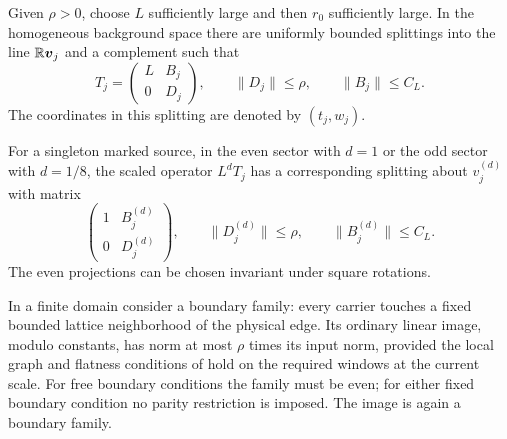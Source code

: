 \begin{proposition}
\label{rg:linear}
Given $\rho>0$, choose $L$ sufficiently large and then $r_0$ sufficiently
large.  In the homogeneous background space there are uniformly bounded
splittings into the line $\mathbb R\boldsymbol v_j$ and a complement such that
\begin{equation}
 T_j=
 \begin{pmatrix}L&B_j\\0&D_j\end{pmatrix},\qquad
 \|D_j\|\le\rho,\qquad \|B_j\|\le C_L.
 \label{rg:background-matrix}
\end{equation}
The coordinates in this splitting are denoted by $(t_j,w_j)$.

For a singleton marked source, in the even sector with $d=1$ or the odd
sector with $d=1/8$, the scaled operator $L^dT_j$ has a corresponding
splitting about $v_j^{(d)}$ with matrix
\begin{equation}
 \begin{pmatrix}1&B_j^{(d)}\\0&D_j^{(d)}\end{pmatrix},\qquad
 \|D_j^{(d)}\|\le\rho,\qquad \|B_j^{(d)}\|\le C_L.
 \label{rg:marked-matrix}
\end{equation}
The even projections can be chosen invariant under square rotations.

In a finite domain consider a boundary family: every carrier touches a
fixed bounded lattice neighborhood of the physical edge.  Its ordinary
linear image, modulo constants, has norm at most $\rho$ times its input
norm, provided the local graph and flatness conditions of
 hold on the required windows at the current scale.
For free boundary conditions the family must be even; for either fixed
boundary condition no parity restriction is imposed.  The image is
again a boundary family.
\end{proposition}

